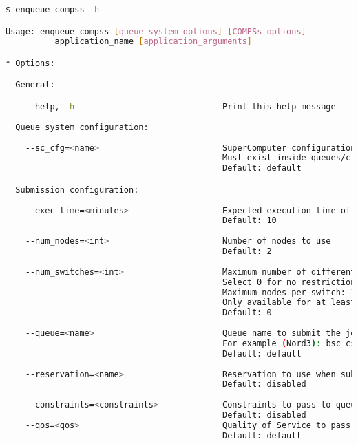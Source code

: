 \begin{lstlisting}[language=bash]
$ enqueue_compss -h

Usage: enqueue_compss [queue_system_options] [COMPSs_options] 
          application_name [application_arguments]

* Options:

  General:

    --help, -h                              Print this help message
  
  Queue system configuration:
  
    --sc_cfg=<name>                         SuperComputer configuration file to use.
                                            Must exist inside queues/cfgs/
                                            Default: default

  Submission configuration: 
  
    --exec_time=<minutes>                   Expected execution time of the application (in minutes)
                                            Default: 10
                                            
    --num_nodes=<int>                       Number of nodes to use
                                            Default: 2
                                            
    --num_switches=<int>                    Maximum number of different switches.
                                            Select 0 for no restrictions.
                                            Maximum nodes per switch: 18
                                            Only available for at least 4 nodes. 
                                            Default: 0 
                                            
    --queue=<name>                          Queue name to submit the job. Depends on the queue system.
                                            For example (Nord3): bsc_cs | bsc_debug | debug | interactive
                                            Default: default
                                            
    --reservation=<name>                    Reservation to use when submitting the job. 
                                            Default: disabled
                                            
    --constraints=<constraints>             Constraints to pass to queue system.
                                            Default: disabled  
    --qos=<qos>                             Quality of Service to pass to the queue system.
                                            Default: default
                                            

\end{lstlisting}
